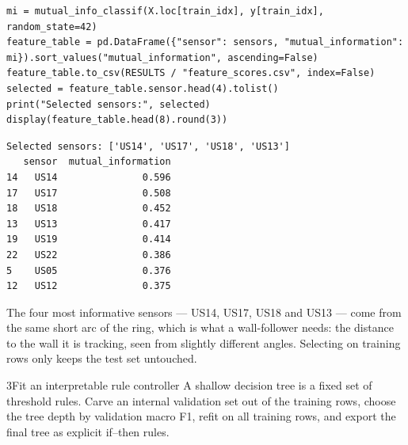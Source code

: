 \begin{labanswer}
\begin{lstlisting}[style=utppython]
mi = mutual_info_classif(X.loc[train_idx], y[train_idx], random_state=42)
feature_table = pd.DataFrame({"sensor": sensors, "mutual_information": mi}).sort_values("mutual_information", ascending=False)
feature_table.to_csv(RESULTS / "feature_scores.csv", index=False)
selected = feature_table.sensor.head(4).tolist()
print("Selected sensors:", selected)
display(feature_table.head(8).round(3))
\end{lstlisting}
\expectedoutput
\begin{lstlisting}[style=utpterminal]
Selected sensors: ['US14', 'US17', 'US18', 'US13']
   sensor  mutual_information
14   US14               0.596
17   US17               0.508
18   US18               0.452
13   US13               0.417
19   US19               0.414
22   US22               0.386
5    US05               0.376
12   US12               0.375
\end{lstlisting}
The four most informative sensors --- US14, US17, US18 and US13 --- come from the same short arc of the ring, which is what a wall-follower needs: the distance to the wall it is tracking, seen from slightly different angles. Selecting on training rows only keeps the test set untouched.
\end{labanswer}

\begin{labquestion}{3}{Fit an interpretable rule controller}
A shallow decision tree is a fixed set of threshold rules. Carve an internal validation set out of the training rows, choose the tree depth by validation macro F1, refit on all training rows, and export the final tree as explicit if--then rules.
\end{labquestion}

